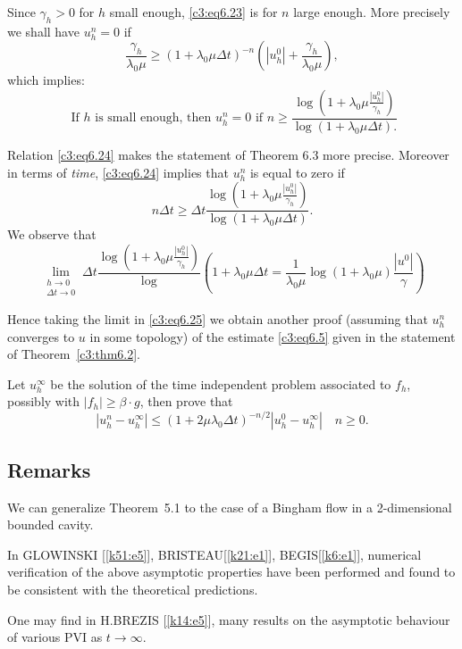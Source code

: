 Since $\gamma_h > 0$ for $h$ small enough, \eqref{c3:eq6.23} is  for $n$ large enough. More precisely we shall have $u^n_h = 0$ if
$$
\frac{\gamma_h}{\lambda_0 \mu} \geq (1+\lambda_0 \mu \Delta  t)^{-n}
\left(|u^0_h| +\frac{\gamma_h} {\lambda_0 \mu}\right),
$$
which implies:
\begin{equation}
\text{ If } h \text{ is small enough, then } u^n_h = 0 \text{ if } n
\geq \frac{\log (1 + \lambda_0 \mu \frac{|u^0_h|}{\gamma_h})}{\log (1+
  \lambda_0 \mu \Delta  t).} \tag{6.24}\label{c3:eq6.24} 
\end{equation}

Relation \eqref{c3:eq6.24} makes the statement of Theorem 6.3 more
precise. Moreover in terms of \textit{time}, \eqref{c3:eq6.24} implies
that $u^n_h$ is equal to zero if 
\begin{equation}
 n \Delta  t \geq \Delta  t \frac{\log (1 + \lambda_0 \mu
   \frac{|u^0_h|}{\gamma_h})}{\log (1+ \lambda_0 \mu \Delta
   t)}. \tag{6.25}\label{c3:eq6.25} 
\end{equation}
We observe that
$$
\lim_{\substack{h \to 0 \\ \Delta  t \to 0}}  \Delta t \frac{\log (1 +
  \lambda_0 \mu \frac{|u^0_h|}{\gamma_h})} \log \left(1+ \lambda_0 \mu
  \Delta  t = \frac{1}{\lambda_0 \mu} \log (1 + \lambda_0 \mu)
\frac{|u^0|}{\gamma}\right) 
$$\pageoriginale 

Hence taking the limit in \eqref{c3:eq6.25} we obtain another proof
(assuming that $u^n_h$ converges to $u$ in some topology) of the
estimate \eqref{c3:eq6.5} given in the statement of
Theorem~\ref{c3:thm6.2}. 

\begin{exercise}\label{c3:exer6.2}%
Let $u^\infty_h$ be the solution of the time independent problem associated to $f_h$, possibly with $|f_h| \geq \beta\cdot g$, then prove that
$$
|u^n_h - u^\infty_h| \leq (1+2 \mu \lambda_0 \Delta  t)^{-n/2} |u^0_h - u^\infty_h| \quad n \geq 0.
$$
\end{exercise} 

\subsection{Remarks}\label{c3:ss6.4}

\begin{remark}\label{c3:rem6.1}%
We can generalize Theorem~5.1 to the case of a Bingham
flow in a 2-dimensional bounded cavity. 
\end{remark}

\begin{remark}\label{c3:rem6.2}%
In GLOWINSKI [\ref{k51:e5}], BRISTEAU[\ref{k21:e1}],
BEGIS[\ref{k6:e1}], numerical 
verification of the 
above asymptotic properties have been performed and found to be
consistent with the theoretical predictions. 
\end{remark}

\begin{remark}\label{c3:rem6.3}%
One may find in H.BREZIS [\ref{k14:e5}], many results on the
asymptotic behaviour of various PVI as $t \to \infty$.  
\end{remark}
